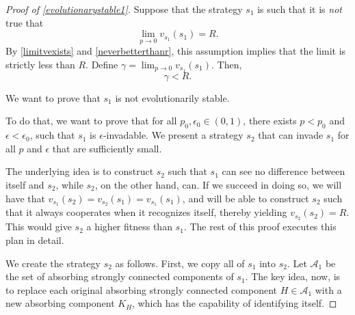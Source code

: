 \documentclass[12pt]{article}
\theoremstyle{definition}
\theoremstyle{remark}
\begin{document}
    \begin{proof}[Proof of \cref{evolutionarystable1}]
      Suppose that the strategy $s_1$ is such that it is \textit{not} true that \begin{equation*}
        \lim_{p \to 0 } v_{s_1}(s_1) = R.
      \end{equation*}
      By \cref{limitvexists} and \cref{neverbetterthanr}, this assumption implies that the limit is strictly less than $R$. Define $\gamma = \lim_{p \to 0} v_{s_1}(s_1)$. Then,
      \begin{equation*}
        \gamma < R.
      \end{equation*}
      
      We want to prove that $s_1$ is not evolutionarily stable. 
      
      To do that, we want to prove that for all $p_0, \epsilon_0 \in (0,1)$, there exists $p < p_0$ and $\epsilon < \epsilon_0$, such that $s_1$ is $\epsilon$-invadable. We present a strategy $s_2$ that can invade $s_1$ for all $p$ and $\epsilon$ that are sufficiently small.


      The underlying idea is to construct $s_2$ such that $s_1$ can see no difference between itself and $s_2$, while $s_2$, on the other hand, can. If we succeed in doing so, we will have that $v_{s_1}(s_2) = v_{s_2}(s_1) = v_{s_1}(s_1)$, and will be able to construct $s_2$ such that it always cooperates when it recognizes itself, thereby yielding $v_{s_2}(s_2) = R$. This would give $s_2$ a higher fitness than $s_1$. The rest of this proof executes this plan in detail.

      We create the strategy $s_2$ as follows. First, we copy all of $s_1$ into $s_2$. Let $\mathcal{A}_1$ be the set of
       absorbing strongly connected components of $s_1$. The key idea, now, is to replace each original absorbing strongly connected component $H \in \mathcal{A}_1$ with a new absorbing component $K_H$, which has the capability of identifying itself.


\end{proof}
\end{document}

